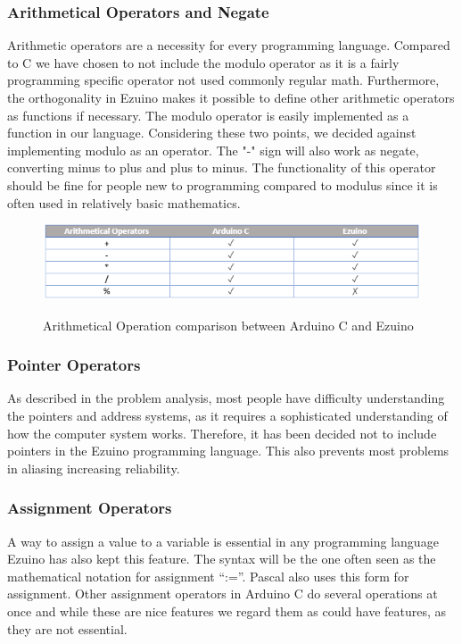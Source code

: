 \subsubsection*{Arithmetical Operators and Negate}
Arithmetic operators are a necessity for every programming language.
Compared to C we have chosen to not include the modulo operator as it is a fairly programming specific operator not used commonly regular math. Furthermore, the orthogonality in Ezuino makes it possible to define other arithmetic operators as functions if necessary. The modulo operator is easily implemented as a function in our language. Considering these two points, we decided against implementing modulo as an operator.
The "-" sign will also work as negate, converting minus to plus and plus to minus. The functionality of this operator should be fine for people new to programming compared to modulus since it is often used in relatively basic mathematics.
\begin{figure}[H]
\centering
\caption{Arithmetical Operation comparison between Arduino C and Ezuino}
\includegraphics[scale=0.80]{figures/language_features/langf05.png}
\label{lf05}
\end{figure}

\subsubsection*{Pointer Operators}
As described in the problem analysis, most people have difficulty understanding the pointers and address systems, as it requires a sophisticated understanding of how the computer system works. Therefore, it has been decided not to include pointers in the Ezuino programming language. This also prevents most problems in aliasing increasing reliability.
\subsubsection*{Assignment Operators}
A way to assign a value to a variable is essential in any programming language Ezuino has also kept this feature. The syntax will be the one often seen as the mathematical notation for assignment “:=”. Pascal also uses this form for assignment. Other assignment operators in Arduino C do several operations at once and while these are nice features we regard them as could have features, as they are not essential.


